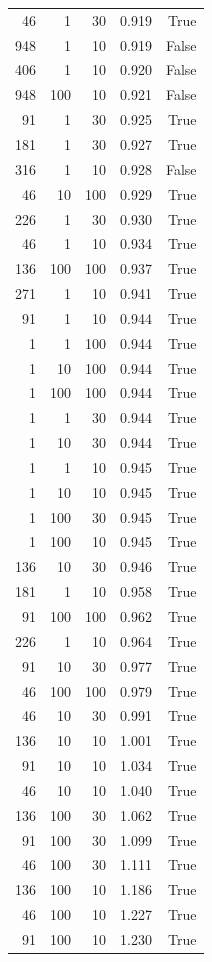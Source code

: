 \begin{tabular}{rrrrr}
46 & 1 & 30 & 0.919 & True \\
948 & 1 & 10 & 0.919 & False \\
406 & 1 & 10 & 0.920 & False \\
948 & 100 & 10 & 0.921 & False \\
91 & 1 & 30 & 0.925 & True \\
181 & 1 & 30 & 0.927 & True \\
316 & 1 & 10 & 0.928 & False \\
46 & 10 & 100 & 0.929 & True \\
226 & 1 & 30 & 0.930 & True \\
46 & 1 & 10 & 0.934 & True \\
136 & 100 & 100 & 0.937 & True \\
271 & 1 & 10 & 0.941 & True \\
91 & 1 & 10 & 0.944 & True \\
1 & 1 & 100 & 0.944 & True \\
1 & 10 & 100 & 0.944 & True \\
1 & 100 & 100 & 0.944 & True \\
1 & 1 & 30 & 0.944 & True \\
1 & 10 & 30 & 0.944 & True \\
1 & 1 & 10 & 0.945 & True \\
1 & 10 & 10 & 0.945 & True \\
1 & 100 & 30 & 0.945 & True \\
1 & 100 & 10 & 0.945 & True \\
136 & 10 & 30 & 0.946 & True \\
181 & 1 & 10 & 0.958 & True \\
91 & 100 & 100 & 0.962 & True \\
226 & 1 & 10 & 0.964 & True \\
91 & 10 & 30 & 0.977 & True \\
46 & 100 & 100 & 0.979 & True \\
46 & 10 & 30 & 0.991 & True \\
136 & 10 & 10 & 1.001 & True \\
91 & 10 & 10 & 1.034 & True \\
46 & 10 & 10 & 1.040 & True \\
136 & 100 & 30 & 1.062 & True \\
91 & 100 & 30 & 1.099 & True \\
46 & 100 & 30 & 1.111 & True \\
136 & 100 & 10 & 1.186 & True \\
46 & 100 & 10 & 1.227 & True \\
91 & 100 & 10 & 1.230 & True \\
\bottomrule
\end{tabular}
